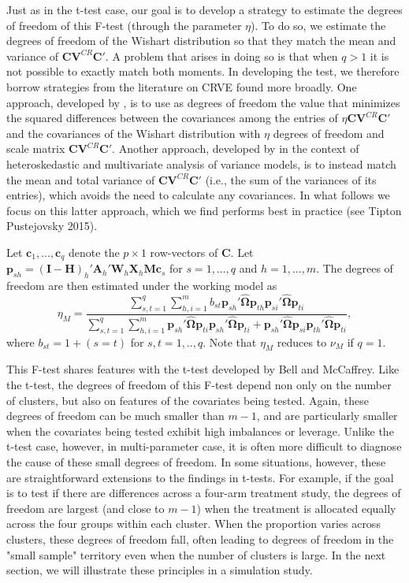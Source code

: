 \documentclass[12pt]{article}\usepackage[]{graphicx}\usepackage[]{color}
\newcommand{\bm}{\mathbf}
\newcommand{\bs}{\boldsymbol}
\begin{document}
Just as in the t-test case, our goal is to develop a strategy to estimate the degrees of freedom of this F-test (through the parameter $\eta$). 
To do so, we estimate the degrees of freedom of the Wishart distribution so that they match the mean and variance of $\bm{C}\bm{V}^{CR} \bm{C}'$. 
A problem that arises in doing so is that when $q > 1$ it is not possible to exactly match both moments. 
In developing the test, we therefore borrow strategies from the literature on CRVE found more broadly. 
One approach, developed by \cite{Pan2002small}, is to use as degrees of freedom the value that minimizes the squared differences between the covariances among the entries of $\eta \bm{C}\bm{V}^{CR}\bm{C}'$ and the covariances of the Wishart distribution with $\eta$ degrees of freedom and scale matrix $\bm{C}\bm{V}^{CR}\bm{C}'$. Another approach, developed by \citet{Zhang2012two-wayANOVA, Zhang2012MANOVA, Zhang2013tests} in the context of heteroskedastic and multivariate analysis of variance models, is to instead match the mean and total variance of $\bm{C}\bm{V}^{CR}\bm{C}'$ (i.e., the sum of the variances of its entries), which avoids the need to calculate any covariances. In what follows we focus on this latter approach, which we find performs best in practice (see Tipton Pustejovsky 2015).

Let $\bm{c}_1,...,\bm{c}_q$ denote the $p \times 1$ row-vectors of $\bm{C}$. 
Let $\bm{p}_{sh} = \left(\bm{I} - \bm{H}\right)_h'\bm{A}_h'\bm{W}_h\bm{X}_h\bm{M}\bm{c}_s$ for $s = 1,...,q$ and $h = 1,...,m$. 
The degrees of freedom are then estimated under the working model as
\begin{equation}
\label{eq:eta_model}
\eta_M = \frac{\sum_{s,t=1}^q \sum_{h,i=1}^m b_{st} \bm{p}_{sh}'\hat{\bs\Omega}\bm{p}_{th} \bm{p}_{si}'\hat{\bs\Omega}\bm{p}_{ti}}{\sum_{s,t=1}^q \sum_{h,i=1}^m \bm{p}_{sh}'\hat{\bs\Omega}\bm{p}_{ti} \bm{p}_{sh}'\hat{\bs\Omega}\bm{p}_{ti} + \bm{p}_{sh}'\hat{\bs\Omega}\bm{p}_{si} \bm{p}_{th}'\hat{\bs\Omega}\bm{p}_{ti}},
\end{equation}
where $b_{st} = 1 + (s=t)$ for $s,t=1,..,q$.
Note that $\eta_M$ reduces to $\nu_M$ if $q = 1$.

This F-test shares features with the t-test developed by Bell and McCaffrey. Like the t-test, the degrees of freedom of this F-test depend non only on the number of clusters, but also on features of the covariates being tested. Again, these degrees of freedom can be much smaller than $m - 1$, and are particularly smaller when the covariates being tested exhibit high imbalances or leverage. Unlike the t-test case, however, in multi-parameter case, it is often more difficult to diagnose the cause of these small degrees of freedom. In some situations, however, these are straightforward extensions to the findings in t-tests. For example, if the goal is to test if there are differences across a four-arm treatment study, the degrees of freedom are largest (and close to $m - 1$) when the treatment is allocated equally across the four groups within each cluster. When the proportion varies across clusters, these degrees of freedom fall, often leading to degrees of freedom in the "small sample" territory even when the number of clusters is large. In the next section, we will illustrate these principles in a simulation study.
\end{document}

